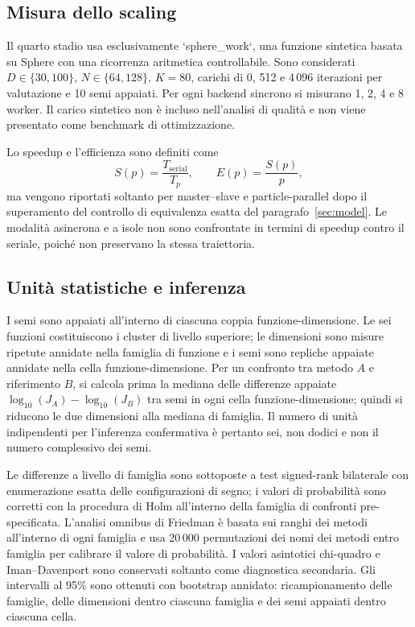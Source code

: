 \subsection{Misura dello scaling}

Il quarto stadio usa esclusivamente `sphere\_work`, una funzione sintetica basata su Sphere con una ricorrenza aritmetica controllabile. Sono considerati $D\in\{30,100\}$, $N\in\{64,128\}$, $K=80$, carichi di 0, 512 e 4\,096 iterazioni per valutazione e 10 semi appaiati. Per ogni backend sincrono si misurano 1, 2, 4 e 8 worker. Il carico sintetico non è incluso nell'analisi di qualità e non viene presentato come benchmark di ottimizzazione.

Lo speedup e l'efficienza sono definiti come
\begin{equation}
  S(p)=\frac{T_{\mathrm{serial}}}{T_p},
  \qquad E(p)=\frac{S(p)}{p},
  \label{eq:speedup-efficiency}
\end{equation}
ma vengono riportati soltanto per master--slave e particle-parallel dopo il superamento del controllo di equivalenza esatta del paragrafo~\ref{sec:model}. Le modalità asincrona e a isole non sono confrontate in termini di speedup contro il seriale, poiché non preservano la stessa traiettoria.

\subsection{Unità statistiche e inferenza}

I semi sono appaiati all'interno di ciascuna coppia funzione-dimensione. Le sei funzioni costituiscono i cluster di livello superiore; le dimensioni sono misure ripetute annidate nella famiglia di funzione e i semi sono repliche appaiate annidate nella cella funzione-dimensione. Per un confronto tra metodo $A$ e riferimento $B$, si calcola prima la mediana delle differenze appaiate $\log_{10}(J_A)-\log_{10}(J_B)$ tra semi in ogni cella funzione-dimensione; quindi si riducono le due dimensioni alla mediana di famiglia. Il numero di unità indipendenti per l'inferenza confermativa è pertanto sei, non dodici e non il numero complessivo dei semi.

Le differenze a livello di famiglia sono sottoposte a test signed-rank bilaterale con enumerazione esatta delle configurazioni di segno; i valori di probabilità sono corretti con la procedura di Holm all'interno della famiglia di confronti pre-specificata. L'analisi omnibus di Friedman è basata sui ranghi dei metodi all'interno di ogni famiglia e usa 20\,000 permutazioni dei nomi dei metodi entro famiglia per calibrare il valore di probabilità. I valori asintotici chi-quadro e Iman--Davenport sono conservati soltanto come diagnostica secondaria. Gli intervalli al 95\% sono ottenuti con bootstrap annidato: ricampionamento delle famiglie, delle dimensioni dentro ciascuna famiglia e dei semi appaiati dentro ciascuna cella.

